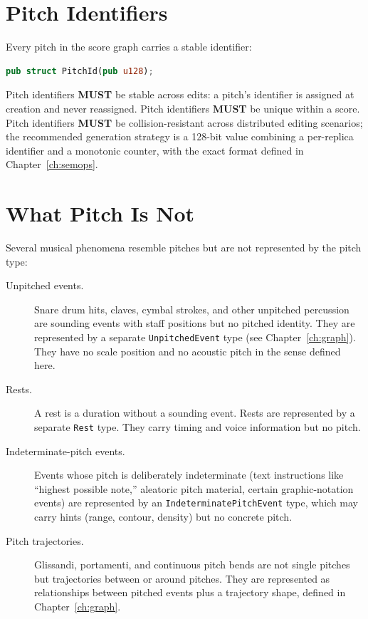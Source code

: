 \documentclass[11pt,letterpaper]{report}
\newcounter{requirement}[chapter]
\newcommand{\MUST}{\textbf{MUST}}
\begin{document}
\section{Pitch Identifiers}
\label{sec:pitch:ids}

Every pitch in the score graph carries a stable identifier:

\begin{lstlisting}[language=Rust]
pub struct PitchId(pub u128);
\end{lstlisting}

\begin{requirement}
  \label{req:pitch:pitch-id-stability}
  Pitch identifiers \MUST{} be stable across edits: a pitch's identifier
  is assigned at creation and never reassigned. Pitch identifiers
  \MUST{} be unique within a score. Pitch identifiers \MUST{} be
  collision-resistant across distributed editing scenarios; the
  recommended generation strategy is a 128-bit value combining a
  per-replica identifier and a monotonic counter, with the exact format
  defined in Chapter~\ref{ch:semops}.
\end{requirement}

\section{What Pitch Is Not}
\label{sec:pitch:not-pitch}

Several musical phenomena resemble pitches but are not represented by
the pitch type:

\begin{description}
  \item[Unpitched events.] Snare drum hits, claves, cymbal strokes, and
    other unpitched percussion are sounding events with staff positions
    but no pitched identity. They are represented by a separate
    \texttt{UnpitchedEvent} type (see Chapter~\ref{ch:graph}). They have
    no scale position and no acoustic pitch in the sense defined here.
  \item[Rests.] A rest is a duration without a sounding event. Rests are
    represented by a separate \texttt{Rest} type. They carry timing and
    voice information but no pitch.
  \item[Indeterminate-pitch events.] Events whose pitch is deliberately
    indeterminate (text instructions like ``highest possible note,''
    aleatoric pitch material, certain graphic-notation events) are
    represented by an \texttt{IndeterminatePitchEvent} type, which may
    carry hints (range, contour, density) but no concrete pitch.
  \item[Pitch trajectories.] Glissandi, portamenti, and continuous pitch
    bends are not single pitches but trajectories between or around
    pitches. They are represented as relationships between pitched
    events plus a trajectory shape, defined in Chapter~\ref{ch:graph}.
\end{description}
\end{document}

